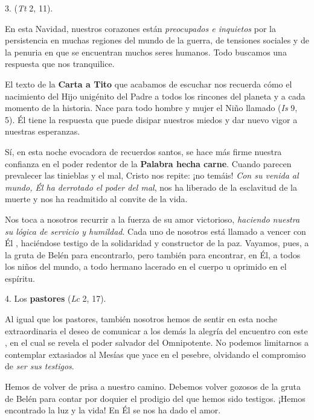 \begin{body}
	3. \emph{} (\emph{Tt} 2, 11).
	
	En esta Navidad, nuestros corazones están \emph{preocupados e inquietos} por la persistencia en muchas regiones del mundo de la guerra, de tensiones sociales y de la penuria en que se encuentran muchos seres humanos. Todo buscamos una respuesta que nos tranquilice.
	
	El texto de la \textbf{Carta a Tito} que acabamos de escuchar nos recuerda cómo el nacimiento del Hijo unigénito del Padre \emph{} a todos los rincones del planeta y a cada momento de la historia. Nace para todo hombre y mujer el Niño llamado \emph{} (\emph{Is} 9, 5). Él tiene la respuesta que puede disipar nuestros miedos y dar nuevo vigor a nuestras esperanzas.
	
	Sí, en esta noche evocadora de recuerdos santos, se hace más firme nuestra confianza en el poder redentor de la \textbf{Palabra hecha carne}. Cuando parecen prevalecer las tinieblas y el mal, Cristo nos repite: ¡no temáis! \emph{Con su venida al mundo, Él ha derrotado el poder del mal}, nos ha liberado de la esclavitud de la muerte y nos ha readmitido al convite de la vida.
	
	Nos toca a nosotros recurrir a la fuerza de su amor victorioso, \emph{haciendo nuestra su lógica de servicio y humildad}. Cada uno de nosotros está llamado a vencer con Él , haciéndose testigo de la solidaridad y constructor de la paz. Vayamos, pues, a la gruta de Belén para encontrarlo, pero también para encontrar, en Él, a todos los niños del mundo, a todo hermano lacerado en el cuerpo u oprimido en el espíritu.
	
	4. Los \textbf{pastores} \emph{} (\emph{Lc} 2, 17).
	
	Al igual que los pastores, también nosotros hemos de sentir en esta noche extraordinaria el deseo de comunicar a los demás la alegría del encuentro con este \emph{}, en el cual se revela el poder salvador del Omnipotente. No podemos limitarnos a contemplar extasiados al Mesías que yace en el pesebre, olvidando el compromiso de \emph{ser sus testigos}.
	
	Hemos de volver de prisa a nuestro camino. Debemos volver gozosos de la gruta de Belén para contar por doquier el prodigio del que hemos sido testigos. ¡Hemos encontrado la luz y la vida! En Él se nos ha dado el amor.
	

\end{body}
